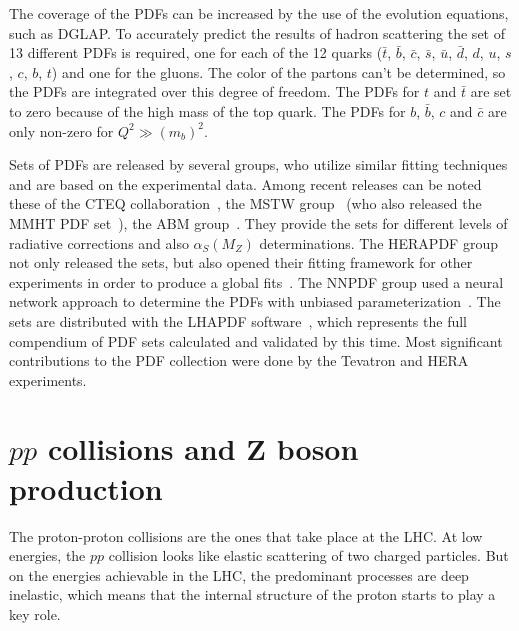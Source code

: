 The coverage of the PDFs can be increased by the use of the evolution equations, such as DGLAP. To accurately predict the results of hadron scattering the set of 13 different PDFs is required, one for each of the 12 quarks ($\bar{t}$, $\bar{b}$, $\bar{c}$, $\bar{s}$, $\bar{u}$, $\bar{d}$, $d$, $u$, $s$, $c$, $b$, $t$) and one for the gluons. The color of the partons can't be determined, so the PDFs are integrated over this degree of freedom. The PDFs for $t$ and $\bar{t}$ are set to zero because of the high mass of the top quark. The PDFs for $b$, $\bar{b}$, $c$ and $\bar{c}$ are only non-zero for $Q^{2} \gg (m_{b})^{2}$.

Sets of PDFs are released by several groups, who utilize similar fitting techniques and are based on the experimental data. Among recent releases can be noted these of the CTEQ collaboration~\cite{lib:MC_pdfct10}, the MSTW group~\cite{lib:MC_pdfmstw1, lib:MC_pdfmstw2} (who also released the MMHT PDF set~\cite{lib:MC_pdfmmht}), the ABM group~\cite{lib:MC_pdfabm}. They provide the sets for different levels of radiative corrections and also $\alpha_{S}(M_{Z})$ determinations. The HERAPDF group not only released the sets, but also opened their fitting framework for other experiments in order to produce a global fits~\cite{lib:MC_pdfhera}. The NNPDF group used a neural network approach to determine the PDFs with unbiased parameterization~\cite{lib:MC_nnpdf1, lib:MC_nnpdf2, lib:MC_nnpdf3}. The sets are distributed with the LHAPDF software~\cite{lib:lhapdf}, which represents the full compendium of PDF sets calculated and validated by this time. Most significant contributions to the PDF collection were done by the Tevatron and HERA experiments.

\section{$pp$ collisions and Z boson production}

The proton-proton collisions are the ones that take place at the LHC. At low energies, the $pp$ collision looks like elastic scattering of two charged particles. But on the energies achievable in the LHC, the predominant processes are deep inelastic, which means that the internal structure of the proton starts to play a key role.


